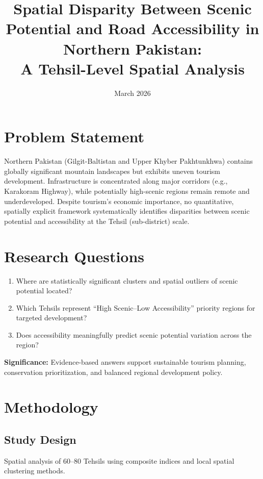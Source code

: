 \documentclass[12pt, a4paper]{article}
\title{Spatial Disparity Between Scenic Potential and Road Accessibility in Northern Pakistan:\\
A Tehsil-Level Spatial Analysis}
\author{}
\date{March 2026}
\begin{document}
\maketitle

\section{Problem Statement}

Northern Pakistan (Gilgit-Baltistan and Upper Khyber Pakhtunkhwa) contains globally significant mountain landscapes but exhibits uneven tourism development. Infrastructure is concentrated along major corridors (e.g., Karakoram Highway), while potentially high-scenic regions remain remote and underdeveloped. Despite tourism's economic importance, no quantitative, spatially explicit framework systematically identifies disparities between scenic potential and accessibility at the Tehsil (sub-district) scale.

\section{Research Questions}

\begin{enumerate}
    \item Where are statistically significant clusters and spatial outliers of scenic potential located?
    \item Which Tehsils represent ``High Scenic--Low Accessibility'' priority regions for targeted development?
    \item Does accessibility meaningfully predict scenic potential variation across the region?
\end{enumerate}

\noindent\textbf{Significance:} Evidence-based answers support sustainable tourism planning, conservation prioritization, and balanced regional development policy.

\section{Methodology}

\subsection{Study Design}

Spatial analysis of 60--80 Tehsils using composite indices and local spatial clustering methods.
\end{document}
